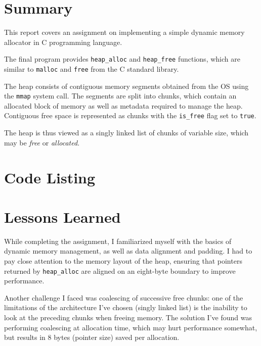 \documentclass[en, listings]{labreport}
\begin{document}
\maketitlepage

\section*{Summary}

This report covers an assignment on implementing a simple dynamic memory
allocator in C programming language.

The final program provides \texttt{heap\_alloc} and \texttt{heap\_free}
functions, which are similar to \texttt{malloc} and \texttt{free} from
the C standard library.

The heap consists of contiguous memory segments obtained from the OS
using the \texttt{mmap} system call. The segments are split into
chunks, which contain an allocated block of memory as well as metadata
required to manage the heap. Contiguous free space is represented
as chunks with the \texttt{is\_free} flag set to \texttt{true}.

The heap is thus viewed as a singly linked list of chunks of variable
size, which may be \textit{free} or \textit{allocated}.

\section*{Code Listing}



\section*{Lessons Learned}

While completing the assignment, I familiarized myself with the 
basics of dynamic memory management, as well as data alignment and padding.
I had to pay close attention to the memory layout of the heap, ensuring
that pointers returned by \texttt{heap\_alloc} are aligned on an eight-byte
boundary to improve performance.

Another challenge I faced was coalescing of successive free chunks:
one of the limitations of the architecture I've chosen (singly linked list)
is the inability to look at the preceding chunks when freeing memory.
The solution I've found was performing coalescing at allocation time,
which may hurt performance somewhat, but results in 8 bytes (pointer size)
saved per allocation.
\end{document}

